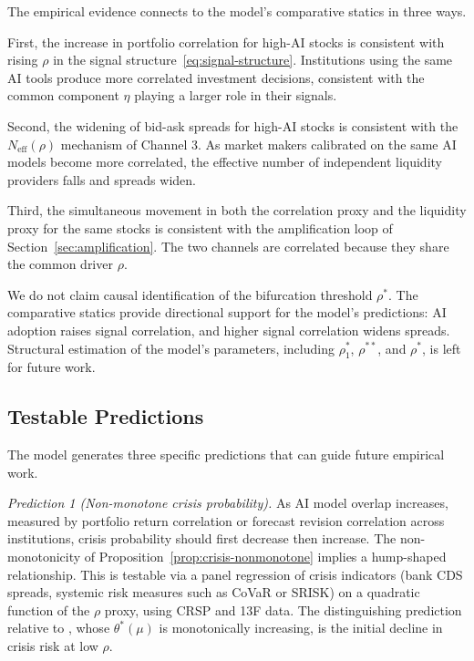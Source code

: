 The empirical evidence connects to the model's comparative statics in three ways.

First, the increase in portfolio correlation for high-AI stocks is consistent with rising $\rho$ in the signal structure~\eqref{eq:signal-structure}. Institutions using the same AI tools produce more correlated investment decisions, consistent with the common component $\eta$ playing a larger role in their signals.

Second, the widening of bid-ask spreads for high-AI stocks is consistent with the $N_{\text{eff}}(\rho)$ mechanism of Channel 3. As market makers calibrated on the same AI models become more correlated, the effective number of independent liquidity providers falls and spreads widen.

Third, the simultaneous movement in both the correlation proxy and the liquidity proxy for the same stocks is consistent with the amplification loop of Section~\ref{sec:amplification}. The two channels are correlated because they share the common driver $\rho$.

We do not claim causal identification of the bifurcation threshold $\rho^*$. The comparative statics provide directional support for the model's predictions: AI adoption raises signal correlation, and higher signal correlation widens spreads. Structural estimation of the model's parameters, including $\rho_1^*$, $\rho^{**}$, and $\rho^*$, is left for future work.

\subsection{Testable Predictions}

The model generates three specific predictions that can guide future empirical work.

\emph{Prediction 1 (Non-monotone crisis probability).} As AI model overlap increases, measured by portfolio return correlation or forecast revision correlation across institutions, crisis probability should first decrease then increase. The non-monotonicity of Proposition~\ref{prop:crisis-nonmonotone} implies a hump-shaped relationship. This is testable via a panel regression of crisis indicators (bank CDS spreads, systemic risk measures such as CoVaR or SRISK) on a quadratic function of the $\rho$ proxy, using CRSP and 13F data. The distinguishing prediction relative to \citet{danielsson2025}, whose $\theta^*(\mu)$ is monotonically increasing, is the initial decline in crisis risk at low $\rho$.

